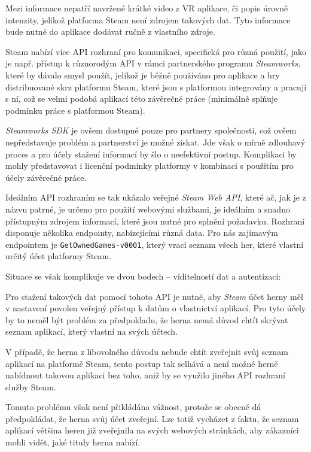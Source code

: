 Mezi informace nepatří navržené krátké video z VR aplikace, či popis úrovně
intenzity, jelikož platforma Steam není zdrojem takových dat. Tyto
informace bude nutné do aplikace dodávat ručně z vlastního zdroje.

Steam nabízí více API rozhraní pro komunikaci, specifická pro různá
použití, jako je např. přístup k různorodým API v rámci partnerského
programu \emph{Steamworks}, které by dávalo smysl použít, jelikož je
běžně používáno pro aplikace a hry distribuované skrz platformu Steam,
které jsou s platformou integrovány a pracují s ní, což se velmi podobá
aplikací této závěrečné práce (minimálně splňuje podmínku práce s
platformou Steam). \autocite{steamworks}

\emph{Steamworks SDK} je ovšem dostupné pouze pro
partnery společnosti, což ovšem nepředstavuje problém a partnerství je možné získat. \autocite{steamworkss}
Jde však o mírně zdlouhavý proces a pro účely stažení informací by šlo o
neefektivní postup. Komplikaci by mohly představovat i licenční podmínky
platformy v kombinaci s použitím pro účely závěrečné práce.

Ideálním API rozhraním se tak ukázalo veřejné \emph{Steam Web API},
které ač, jak je z názvu patrné, je určeno pro použití webovými
službami, je ideálním a snadno přístupným zdrojem informací, které jsou
nutné pro splnění požadavku. \autocite{steamwebapi} Rozhraní disponuje několika endpointy,
nabízejícími různá data. Pro nás zajímavým endpointem je
\texttt{GetOwnedGames-v0001}, který vrací seznam všech her, které
vlastní určitý účet platformy Steam. \autocite{swadocs}

Situace se však komplikuje ve dvou bodech -- viditelností dat a
autentizací:

Pro stažení takových dat pomocí tohoto API je nutné, aby \emph{Steam} 
účet herny měl v nastavení povolen veřejný přístup k
datům o vlastnictví aplikací. Pro tyto účely by to neměl být problém za
předpokladu, že herna nemá důvod chtít skrývat seznam aplikací, který vlastní
na svých účtech. 

V případě, že herna z libovolného důvodu nebude chtít
zveřejnit svůj seznam aplikací na platformě Steam, tento postup tak selhává a
není možné herně nabídnout takovou aplikaci bez toho, aniž by se využilo
jiného API rozhraní služby Steam. 

Tomuto problému však není přikládána
vážnost, protože se obecně dá předpokládat, že herna svůj účet zveřejní.
Lze totiž vycházet z faktu, že seznam aplikací většina heren již zveřejnila
na svých webových stránkách, aby zákazníci mohli vidět, jaké tituly
herna nabízí.

